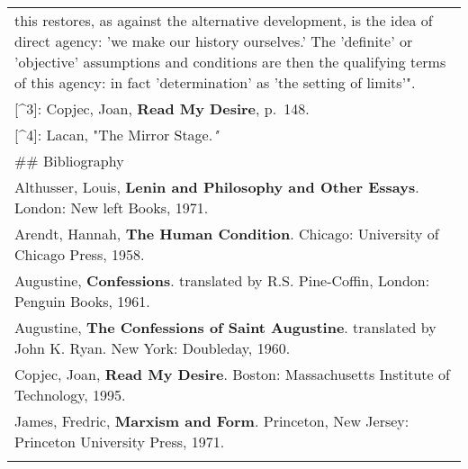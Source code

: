 \begin{longtable}[]{@{}l@{}}
\begin{minipage}[t]{0.97\columnwidth}
this restores, as against the alternative development, is the idea of
direct agency: 'we make our history ourselves.' The 'definite' or
'objective' assumptions and conditions are then the qualifying terms of
this agency: in fact 'determination' as 'the setting of limits'".\strut
\end{minipage}\tabularnewline
\begin{minipage}[t]{0.97\columnwidth}\raggedright
{[}\^{}3{]}: Copjec, Joan, \textbf{Read My Desire}, p.~148.\strut
\end{minipage}\tabularnewline
\begin{minipage}[t]{0.97\columnwidth}\raggedright
{[}\^{}4{]}: Lacan, "The Mirror Stage.\emph{"}\strut
\end{minipage}\tabularnewline
\begin{minipage}[t]{0.97\columnwidth}\raggedright
\#\# Bibliography\strut
\end{minipage}\tabularnewline
\begin{minipage}[t]{0.97\columnwidth}\raggedright
Althusser, Louis, \textbf{Lenin and Philosophy and Other Essays}.
London: New left Books, 1971.\strut
\end{minipage}\tabularnewline
\begin{minipage}[t]{0.97\columnwidth}\raggedright
Arendt, Hannah, \textbf{The Human Condition}. Chicago: University of
Chicago Press, 1958.\strut
\end{minipage}\tabularnewline
\begin{minipage}[t]{0.97\columnwidth}\raggedright
Augustine, \textbf{Confessions}. translated by R.S. Pine-Coffin, London:
Penguin Books, 1961.\strut
\end{minipage}\tabularnewline
\begin{minipage}[t]{0.97\columnwidth}\raggedright
Augustine, \textbf{The Confessions of Saint Augustine}. translated by
John K. Ryan. New York: Doubleday, 1960.\strut
\end{minipage}\tabularnewline
\begin{minipage}[t]{0.97\columnwidth}\raggedright
Copjec, Joan, \textbf{Read My Desire}. Boston: Massachusetts Institute
of Technology, 1995.\strut
\end{minipage}\tabularnewline
\begin{minipage}[t]{0.97\columnwidth}\raggedright
James, Fredric, \textbf{Marxism and Form}. Princeton, New Jersey:
Princeton University Press, 1971.\strut
\end{minipage}\tabularnewline
\begin{minipage}[t]{0.97\columnwidth}\raggedright

\end{minipage}
\end{longtable}
